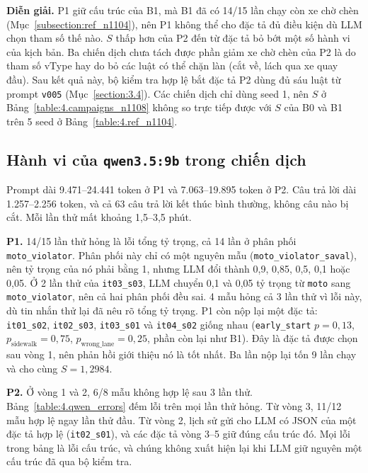 \documentclass[../main.tex]{subfiles}
\begin{document}
\textbf{Diễn giải.} P1 giữ cấu trúc của B1, mà B1 đã có 14/15 lần chạy còn xe chờ chèn (Mục~\ref{subsection:ref_n1104}), nên P1 không thể cho đặc tả đủ điều kiện dù LLM chọn tham số thế nào. $S$ thấp hơn của P2 đến từ đặc tả bỏ bớt một số hành vi của kịch bản. Ba chiến dịch chưa tách được phần giảm xe chờ chèn của P2 là do tham số vType hay do bỏ các luật có thể chặn làn (cắt về, lách qua xe quay đầu). Sau kết quả này, bộ kiểm tra hợp lệ bắt đặc tả P2 dùng đủ sáu luật từ prompt \texttt{v005} (Mục~\ref{section:3.4}). Các chiến dịch chỉ dùng seed 1, nên $S$ ở Bảng~\ref{table:4.campaigns_n1108} không so trực tiếp được với $S$ của B0 và B1 trên 5 seed ở Bảng~\ref{table:4.ref_n1104}.

\subsection{Hành vi của \texttt{qwen3.5:9b} trong chiến dịch}
\label{subsection:qwen_campaign}

Prompt dài 9.471--24.441 token ở P1 và 7.063--19.895 token ở P2. Câu trả lời dài 1.257--2.256 token, và cả 63 câu trả lời kết thúc bình thường, không câu nào bị cắt. Mỗi lần thử mất khoảng 1,5--3,5 phút.

\textbf{P1.} 14/15 lần thử hỏng là lỗi tổng tỷ trọng, cả 14 lần ở phân phối \texttt{moto\_violator}. Phân phối này chỉ có một nguyên mẫu (\texttt{moto\_violator\_saval}), nên tỷ trọng của nó phải bằng 1, nhưng LLM đổi thành 0,9, 0,85, 0,5, 0,1 hoặc 0,05. Ở 2 lần thử của \texttt{it03\_s03}, LLM chuyển 0,1 và 0,05 tỷ trọng từ \texttt{moto} sang \texttt{moto\_violator}, nên cả hai phân phối đều sai. 4 mẫu hỏng cả 3 lần thử vì lỗi này, dù tin nhắn thử lại đã nêu rõ tổng tỷ trọng. P1 còn nộp lại một đặc tả: \texttt{it01\_s02}, \texttt{it02\_s03}, \texttt{it03\_s01} và \texttt{it04\_s02} giống nhau (\texttt{early\_start} $p = 0{,}13$, $p_{\text{sidewalk}} = 0{,}75$, $p_{\text{wrong\_lane}} = 0{,}25$, phần còn lại như B1). Đây là đặc tả được chọn sau vòng 1, nên phản hồi giới thiệu nó là tốt nhất. Ba lần nộp lại tốn 9 lần chạy và cho cùng $S = 1{,}2984$.

\textbf{P2.} Ở vòng 1 và 2, 6/8 mẫu không hợp lệ sau 3 lần thử. Bảng~\ref{table:4.qwen_errors} đếm lỗi trên mọi lần thử hỏng. Từ vòng 3, 11/12 mẫu hợp lệ ngay lần thử đầu. Từ vòng 2, lịch sử gửi cho LLM có JSON của một đặc tả hợp lệ (\texttt{it02\_s01}), và các đặc tả vòng 3--5 giữ đúng cấu trúc đó. Mọi lỗi trong bảng là lỗi cấu trúc, và chúng không xuất hiện lại khi LLM giữ nguyên một cấu trúc đã qua bộ kiểm tra.
\end{document}

